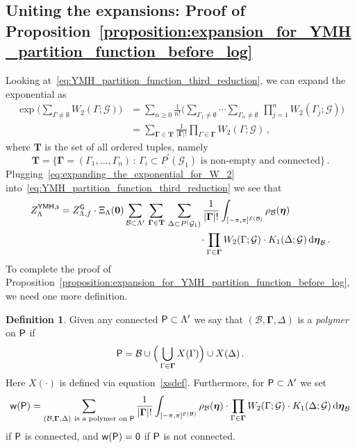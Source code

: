 \documentclass[11pt]{article}
\theoremstyle{definition}
\newtheorem{definition}[theorem]{Definition}
\theoremstyle{remark}
\numberwithin{theorem}{section}
\def\La{{\Lambda}}
\def\Ga{{\Gamma}}
\newcommand{\cE}{\mathcal{E}}
\newcommand{\cB}{\mathcal B}
\newcommand{\cG}{\mathcal G}
\begin{document}
    \subsection{Uniting the expansions: Proof of Proposition~\ref{proposition:expansion_for_YMH_partition_function_before_log}}
    Looking at~\eqref{eq:YMH_partition_function_third_reduction}, we can expand the exponential as
    \begin{align} \label{eq:expanding_the_exponential_for_W_2} \nonumber 
        \exp\Big( \sum_{\Ga\not=\emptyset} W_2(\Ga;\mathcal{G}) \Big) &= \sum_{n\ge 0} \frac{1}{n!} \bigg(\sum_{\Ga_1\not= \emptyset} \cdots \sum_{\Ga_n \not= \emptyset} \,  \prod_{j=1}^n W_2(\Ga_j;\mathcal{G})  \bigg) \\ & = \sum_{\mathbf{\Ga} \in \mathbf{T}} \frac{1}{|\mathbf{\Ga}|!}  \prod_{\Ga\in \mathbf{\Ga}} W_2(\Ga;\mathcal{G}) \, ,
    \end{align}
    where $\mathbf{T}$ is the set of all ordered tuples, namely
    \begin{equation*}
        \mathbf{T} = \big\{ \boldsymbol{\Ga} = (\Ga_1,\ldots,\Ga_n) \, : \, \Ga_i\subset P^\prime(\cG_1) \text{ is non-empty and connected} \big\} \, .
    \end{equation*}
    Plugging~\eqref{eq:expanding_the_exponential_for_W_2} into~\eqref{eq:YMH_partition_function_third_reduction} we see that 
    \begin{align}
        \label{eq:YMH_partition_function_forth_reduction}
        Z_{\Lambda}^{\sf YMH,s}  &=  Z_{\Lambda,f}^{\sf G} \cdot \Xi_{\Lambda}(\mathbf{0}) \sum_{\mathcal{B}\subset \Lambda^\prime } \, \sum_{\mathbf{\Ga}\in \mathbf{T}} \,  \sum_{\Delta\subset P^(\cG_1)} \frac{1}{|\mathbf{\Ga}|!} \int_{[-\pi,\pi]^{\cE(\mathcal{B})}} \rho_{\mathcal{B}}(\boldsymbol{\eta}) \notag \\
        &\hskip2in \cdot   \prod_{\Ga\in \mathbf{\Ga}} W_2(\Ga;\mathcal{G}) \cdot K_1(\Delta;\mathcal{G}) \,  {\rm d}\boldsymbol{\eta}_{\mathcal{B}} \, .
    \end{align}
    To complete the proof of Proposition~\ref{proposition:expansion_for_YMH_partition_function_before_log}, we need one more definition.
    \begin{definition}
    \label{def:polymer}
    Given any connected ${\sf P} \subset \La^\prime$ we say that $(\mathcal{B},\mathbf{\Ga},\Delta)$ is a \emph{polymer} on ${\sf P}$ if
    \[
    {\sf P} = \cB \cup \Big(\bigcup_{\Ga\in \mathbf{\Ga}} X(\Ga)\Big) \cup X(\Delta) \, . 
    \]
    Here $X(\cdot)$ is defined via equation~\eqref{xsdef}. Furthermore, for ${\sf P}\subset \La^\prime$ we set 
    \begin{equation}
        \label{eq:def_of_w}
        {\sf w}({\sf P}) = \sum_{(\mathcal{B},\mathbf{\Ga},\Delta) \ \text{is a polymer on } {\sf P}} \frac{1}{|\mathbf{\Ga}|!} \int_{[-\pi,\pi]^{\cE(\mathcal{B})}} \rho_{\mathcal{B}}(\boldsymbol{\eta}) \cdot   \prod_{\Ga\in \mathbf{\Ga}} W_2(\Ga;\mathcal{G}) \cdot K_1(\Delta;\mathcal{G}) \,  {\rm d}\boldsymbol{\eta}_{\mathcal{B}}  
    \end{equation}
    if ${\sf P}$ is connected, and ${\sf w}(\sf P) = 0$ if ${\sf P}$ is not connected. 
    \end{definition}
\end{document}

